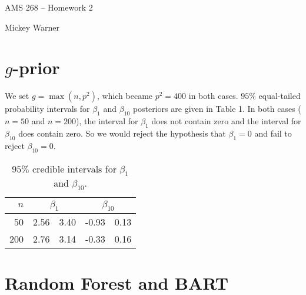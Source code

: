 \documentclass[12pt]{article}
\begin{document}
AMS 268 -- Homework 2

Mickey Warner
\bigskip
\bigskip

\section{$g$-prior}

We set $g=\max(n, p^2)$, which became $p^2=400$ in both cases. $95\%$ equal-tailed probability intervals for $\beta_{1}$ and $\beta_{10}$ posteriors are given in Table 1. In both cases ($n=50$ and $n=200$), the interval for $\beta_1$ does not contain zero and the interval for $\beta_{10}$ does contain zero. So we would reject the hypothesis that $\beta_1=0$ and fail to reject $\beta_{10}=0$.

\begin{table}[ht]
\centering
\begin{tabular}{r|rr|rr}
  \hline\hline
$n$ & \multicolumn{2}{c|}{$\beta_1$} & \multicolumn{2}{c}{$\beta_{10}$}  \\ \hline
50  & 2.56 & 3.40 & -0.93 & 0.13 \\ 
200 & 2.76 & 3.14 & -0.33 & 0.16 \\ 
   \hline\hline
\end{tabular}
\caption{$95\%$ credible intervals for $\beta_1$ and $\beta_{10}$.}
\end{table}



\section{Random Forest and BART}
\end{document}
